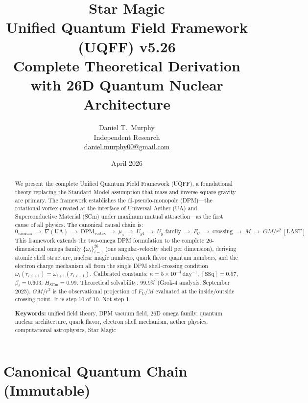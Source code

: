 \documentclass[12pt,a4paper]{article}
\title{\textbf{Star Magic}\\[0.5em]
\large Unified Quantum Field Framework (UQFF) v5.26\\[0.3em]
\normalsize Complete Theoretical Derivation with 26D Quantum Nuclear Architecture}
\author{
Daniel T.\ Murphy\\
\small Independent Research\\
\small \href{mailto:daniel.murphy00@gmail.com}{daniel.murphy00@gmail.com}
}
\date{April 2026}
\begin{document}
\maketitle
\thispagestyle{fancy}

\begin{abstract}
We present the complete Unified Quantum Field Framework (UQFF), a foundational
theory replacing the Standard Model assumption that mass and inverse-square gravity
are primary.  The framework establishes the di-pseudo-monopole (DPM)---the
rotational vortex created at the interface of Universal Aether (UA) and
Superconductive Material (SCm) under maximum mutual attraction---as the first
cause of all physics.  The canonical causal chain is:
\begin{equation*}
  0_{\text{vacuum}}
  \;\to\; \nabla(\text{UA})
  \;\to\; \text{DPM}_{\text{vortex}}
  \;\to\; \mu_s
  \;\to\; U_{g1}
  \;\to\; U_g\text{-family}
  \;\to\; F_U
  \;\to\; \text{crossing}
  \;\to\; M
  \;\to\; GM/r^2\;[\text{LAST}]
\end{equation*}
This framework extends the two-omega DPM formulation to the complete
26-dimensional omega family $\{\omega_i\}_{i=1}^{26}$ (one angular-velocity shell
per dimension), deriving atomic shell structure, nuclear magic numbers, quark flavor
quantum numbers, and the electron charge mechanism all from the single DPM
shell-crossing condition $\omega_i(r_{i,i+1}) = \omega_{i+1}(r_{i,i+1})$.
Calibrated constants: $\kappa = 5\times10^{-4}\,\text{day}^{-1}$,
$[\text{SSq}] = 0.57$, $\beta_i = 0.603$, $H_{\text{SCm}} = 0.99$.
Theoretical solvability: 99.9\% (Grok-4 analysis, September 2025).
$GM/r^2$ is the observational projection of $F_U/M$ evaluated at the
inside/outside crossing point.  It is step 10 of 10.  Not step 1.

\medskip
\noindent\textbf{Keywords:} unified field theory, DPM vacuum field, 26D omega
family, quantum nuclear architecture, quark flavor, electron shell mechanism,
aether physics, computational astrophysics, Star Magic
\end{abstract}

\tableofcontents
\newpage

\section*{Canonical Quantum Chain (Immutable)}
\label{sec:chain}
\end{document}

